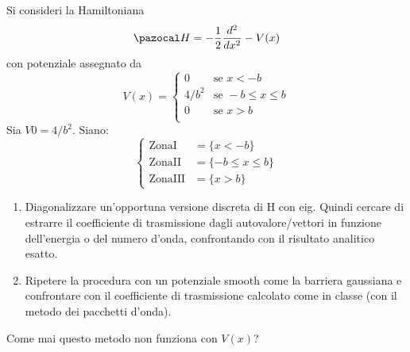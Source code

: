 Si consideri la Hamiltoniana
$$ \Hh = -\frac{1}{2} \frac{ d^2}{dx^2} - V(x) $$
con potenziale assegnato da
$$
V(x)  = \begin{cases}
        0       & \mbox{se } x<-b \\
        4/b^2   & \mbox{se } -b \leq x \leq b \\
        0       & \mbox{se } x>b \\
         \end{cases}
$$
Sia $V0 = 4/b^2$. Siano:
$$
\begin{cases}
    \mbox{ZonaI} & = \{x<-b \} \\
    \mbox{ZonaII} & = \{-b \leq x \leq b\} \\
    \mbox{ZonaIII} & = \{x>b\}
\end{cases} $$

\bigskip
\begin{enumerate}
  \item Diagonalizzare un'opportuna versione discreta di H con eig. Quindi cercare di
  estrarre il coefficiente di trasmissione dagli autovalore/vettori in funzione dell'energia
  o del numero d'onda, confrontando con il risultato analitico esatto.

  \item Ripetere la procedura con un potenziale smooth come la barriera gaussiana e confrontare
  con il coefficiente di trasmissione calcolato come in classe (con il metodo
  dei pacchetti d'onda).
\end{enumerate}

Come mai questo metodo non funziona con $V(x)$?
